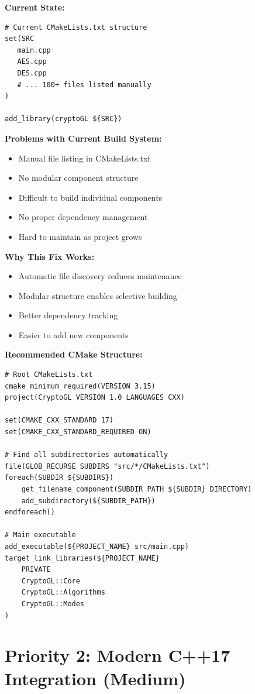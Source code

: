 \documentclass[11pt,a4paper]{article}
\begin{document}
\textbf{Current State:}
\begin{lstlisting}
# Current CMakeLists.txt structure
set(SRC
   main.cpp
   AES.cpp
   DES.cpp
   # ... 100+ files listed manually
)

add_library(cryptoGL ${SRC})
\end{lstlisting}

\textcolor{problemred}{\textbf{Problems with Current Build System:}}
\begin{itemize}
    \item Manual file listing in CMakeLists.txt
    \item No modular component structure
    \item Difficult to build individual components
    \item No proper dependency management
    \item Hard to maintain as project grows
\end{itemize}

\textcolor{solutiongreen}{\textbf{Why This Fix Works:}}
\begin{itemize}
    \item Automatic file discovery reduces maintenance
    \item Modular structure enables selective building
    \item Better dependency tracking
    \item Easier to add new components
\end{itemize}

\textbf{Recommended CMake Structure:}
\begin{lstlisting}
# Root CMakeLists.txt
cmake_minimum_required(VERSION 3.15)
project(CryptoGL VERSION 1.0 LANGUAGES CXX)

set(CMAKE_CXX_STANDARD 17)
set(CMAKE_CXX_STANDARD_REQUIRED ON)

# Find all subdirectories automatically
file(GLOB_RECURSE SUBDIRS "src/*/CMakeLists.txt")
foreach(SUBDIR ${SUBDIRS})
    get_filename_component(SUBDIR_PATH ${SUBDIR} DIRECTORY)
    add_subdirectory(${SUBDIR_PATH})
endforeach()

# Main executable
add_executable(${PROJECT_NAME} src/main.cpp)
target_link_libraries(${PROJECT_NAME} 
    PRIVATE 
    CryptoGL::Core
    CryptoGL::Algorithms
    CryptoGL::Modes
)
\end{lstlisting}

\section{Priority 2: Modern C++17 Integration (Medium)}
\end{document}
